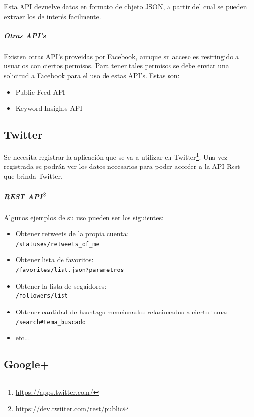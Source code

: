\documentclass[oneside]{book}
\begin{document}
	Esta API devuelve datos en formato de objeto JSON, a partir del cual se pueden extraer los de inter\'{e}s facilmente.


	\subparagraph*{Otras API's}
	Existen otras API's proveidas por Facebook, aunque su acceso es restringido a usuarios con ciertos permisos. Para tener tales permisos se debe enviar una solicitud a Facebook para el uso de estas API's.
	Estas son:
	\begin{itemize}
		\item Public Feed API
		\item Keyword Insights API
	\end{itemize}
	
\bigskip

\subsection{Twitter}
Se necesita registrar la aplicaci\'{o}n que se va a utilizar en Twitter\footnote{\url{https://apps.twitter.com/}}. Una vez registrada se podr\'{a}n ver los datos necesarios para poder acceder a la API Rest que brinda Twitter.

	\subparagraph*{REST API\footnote{\url{https://dev.twitter.com/rest/public}}}
	Algunos ejemplos de su uso pueden ser los siguientes:

	\begin{itemize}
		\item Obtener retweets de la propia cuenta:  \\
		\texttt{/statuses/retweets\_of\_me}

		\item Obtener lista de favoritos: \\
		\texttt{/favorites/list.json?parametros}

		\item Obtener la lista de seguidores:\\
		\texttt{/followers/list}
	
		\item Obtener cantidad de hashtags mencionados relacionados a cierto tema:\\
		\texttt{/search\#tema\_buscado}
	
		\item etc...

	\end{itemize}	 

\bigskip

\subsection{Google+}
\end{document}
